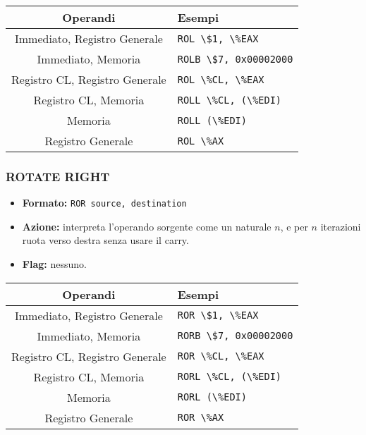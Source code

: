 \documentclass[a4paper,11pt]{article}
\begin{document}
		\begin{table}[H]
		\center {}
			\begin{tabular} { c | p{5cm} }
				\bfseries Operandi & \bfseries Esempi \\
				\hline
				Immediato, Registro Generale & \lstinline|ROL \$1, \%EAX| \\
				Immediato, Memoria & \lstinline|ROLB \$7, 0x00002000| \\
				Registro CL, Registro Generale & \lstinline|ROL \%CL, \%EAX| \\
				Registro CL, Memoria & \lstinline|ROLL \%CL, (\%EDI)| \\
				Memoria & \lstinline|ROLL (\%EDI)| \\ 
				Registro Generale & \lstinline|ROL \%AX|
			\end{tabular}
		\end{table}

\subsubsection{ROTATE RIGHT}
\begin{itemize}
	\item \textbf{Formato:} \lstinline|ROR source, destination|
	\item \textbf{Azione:} interpreta l'operando sorgente come un naturale $n$, e per $n$ iterazioni ruota verso destra senza usare il carry.
	\item \textbf{Flag:} nessuno.
\end{itemize}

		\begin{table}[H]
		\center {}
			\begin{tabular} { c | p{5cm} }
				\bfseries Operandi & \bfseries Esempi \\
				\hline
				Immediato, Registro Generale & \lstinline|ROR \$1, \%EAX| \\
				Immediato, Memoria & \lstinline|RORB \$7, 0x00002000| \\
				Registro CL, Registro Generale & \lstinline|ROR \%CL, \%EAX| \\
				Registro CL, Memoria & \lstinline|RORL \%CL, (\%EDI)| \\
				Memoria & \lstinline|RORL (\%EDI)| \\ 
				Registro Generale & \lstinline|ROR \%AX|
			\end{tabular}
		\end{table}
\end{document}
